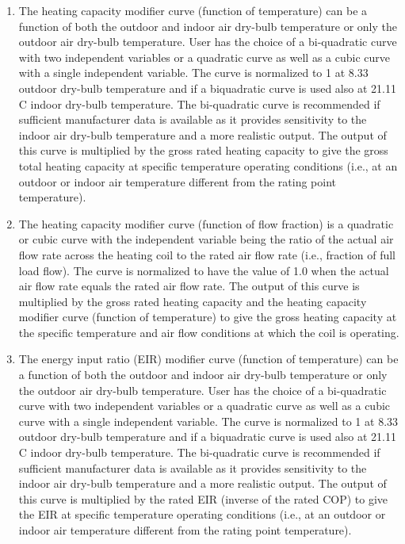\begin{enumerate}
\def\labelenumi{\arabic{enumi})}
\item
  The heating capacity modifier curve (function of temperature) can be a function of both the outdoor and indoor air dry-bulb temperature or only the outdoor air dry-bulb temperature. User has the choice of a bi-quadratic curve with two independent variables or a quadratic curve as well as a cubic curve with a single independent variable. The curve is normalized to 1 at 8.33 outdoor dry-bulb temperature and if a biquadratic curve is used also at 21.11 C indoor dry-bulb temperature. The bi-quadratic curve is recommended if sufficient manufacturer data is available as it provides sensitivity to the indoor air dry-bulb temperature and a more realistic output. The output of this curve is multiplied by the gross rated heating capacity to give the gross total heating capacity at specific temperature operating conditions (i.e., at an outdoor or indoor air temperature different from the rating point temperature).
\item
  The heating capacity modifier curve (function of flow fraction) is a quadratic or cubic curve with the independent variable being the ratio of the actual air flow rate across the heating coil to the rated air flow rate (i.e., fraction of full load flow). The curve is normalized to have the value of 1.0 when the actual air flow rate equals the rated air flow rate. The output of this curve is multiplied by the gross rated heating capacity and the heating capacity modifier curve (function of temperature) to give the gross heating capacity at the specific temperature and air flow conditions at which the coil is operating.
\item
  The energy input ratio (EIR) modifier curve (function of temperature) can be a function of both the outdoor and indoor air dry-bulb temperature or only the outdoor air dry-bulb temperature. User has the choice of a bi-quadratic curve with two independent variables or a quadratic curve as well as a cubic curve with a single independent variable. The curve is normalized to 1 at 8.33 outdoor dry-bulb temperature and if a biquadratic curve is used also at 21.11 C indoor dry-bulb temperature. The bi-quadratic curve is recommended if sufficient manufacturer data is available as it provides sensitivity to the indoor air dry-bulb temperature and a more realistic output. The output of this curve is multiplied by the rated EIR (inverse of the rated COP) to give the EIR at specific temperature operating conditions (i.e., at an outdoor or indoor air temperature different from the rating point temperature).

\end{enumerate}

